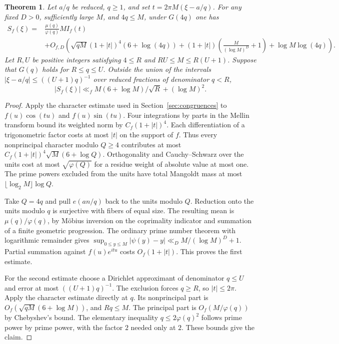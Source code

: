 \documentclass[11pt,a4paper]{article}
\newtheorem{theorem}{Theorem}[section]
\begin{document}
\begin{theorem}\label{th:rational}
Let $a/q$ be reduced, $q\ge1$, and set $t=2\pi M(\xi-a/q)$.
For any fixed $D>0$, sufficiently large $M$, and $4q\le M$, under $G(4q)$ one has
\begin{align*}
 S_f(\xi)={}&\frac{\mu(q)}{\varphi(q)}M I_f(t)\\
 &+O_{f,D}\!\left(\sqrt{qM}(1+|t|)^4(6+\log(4q))
 +(1+|t|)\left(\frac{M}{(\log M)^D}+1\right)
 +\log M\log(4q)\right).
\end{align*}
Let $R,U$ be positive integers satisfying $4\le R$ and $RU\le M\le R(U+1)$.
Suppose that $G(q)$ holds for $R\le q\le U$. Outside the union of the intervals
$|\xi-a/q|\le((U+1)q)^{-1}$ over reduced fractions of denominator $q<R$,
\[
 |S_f(\xi)|\ll_f M(6+\log M)/\sqrt R+(\log M)^2 .
\]
\end{theorem}

\begin{proof}
Apply the character estimate used in Section~\ref{sec:congruences} to
$f(u)\cos(tu)$ and $f(u)\sin(tu)$. Four integrations by parts in the Mellin
transform bound its weighted norm by $C_f(1+|t|)^4$. Each differentiation
of a trigonometric factor costs at most $|t|$ on the support of $f$.
Thus every nonprincipal character modulo $Q\ge4$ contributes at most
$C_f(1+|t|)^4\sqrt M(6+\log Q)$. Orthogonality and Cauchy--Schwarz
over the units cost at most $\sqrt{\varphi(Q)}$ for a residue weight of
absolute value at most one. The prime powers excluded from the units
have total Mangoldt mass at most $\lfloor\log_2 M\rfloor\log Q$.

Take $Q=4q$ and pull $e(an/q)$ back to the units modulo $Q$. Reduction
onto the units modulo $q$ is surjective with fibers of equal size.
The resulting mean is $\mu(q)/\varphi(q)$, by M\"obius inversion on the
coprimality indicator and summation of a finite geometric progression.
The ordinary prime number theorem with logarithmic remainder gives
$\sup_{0\le y\le M}|\psi(y)-y|\ll_D M/(\log M)^D+1$. Partial summation
against $f(u)e^{itu}$ costs $O_f(1+|t|)$. This proves the first estimate.

For the second estimate choose a Dirichlet approximant of denominator
$q\le U$ and error at most $((U+1)q)^{-1}$. The exclusion forces $q\ge R$,
so $|t|\le 2\pi$. Apply the character estimate directly at $q$. Its
nonprincipal part is $O_f(\sqrt{qM}(6+\log M))$, and $Rq\le M$.
The principal part is $O_f(M/\varphi(q))$ by Chebyshev's bound.
The elementary inequality $q\le2\varphi(q)^2$ follows prime power by prime
power, with the factor $2$ needed only at $2$. These bounds give the claim.
\end{proof}
\end{document}
